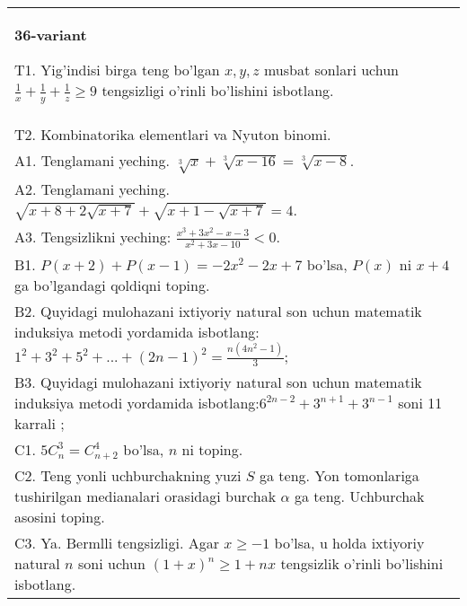 \documentclass{article}
\begin{document}
\begin{tabular}{m{17cm}}
\textbf{36-variant}
\newline

T1. Yig'indisi birga teng bo'lgan \(x,y,z\) musbat sonlari uchun \(\frac{1}{x} + \frac{1}{y} + \frac{1}{z} \geq 9\) tengsizligi o'rinli bo'lishini isbotlang. \\
T2. Kombinatorika elementlari va Nyuton binomi. \\
A1. Tenglamani yeching. \(\sqrt[3]{x} + \sqrt[3]{x - 16} = \sqrt[3]{x - 8}\). \\
A2. Tenglamani yeching. \(\sqrt{x + 8 + 2\sqrt{x + 7}} + \sqrt{x + 1 - \sqrt{x + 7}} = 4\). \\
A3. Tengsizlikni yeching: \(\frac{x^{3} + 3x^{2} - x - 3}{x^{2} + 3x - 10} < 0\). \\
B1. \(P(x + 2) + P(x - 1) = - 2x^{2} - 2x + 7\) bo'lsa, \(P(x)\) ni \(x + 4\) ga bo'lgandagi qoldiqni toping. \\
B2. Quyidagi mulohazani ixtiyoriy natural son uchun matematik induksiya metodi yordamida isbotlang: \(1^{2} + 3^{2} + 5^{2} + ... + (2n - 1)^{2} = \frac{n\left( 4n^{2} - 1 \right)}{3}\); \\
B3. Quyidagi mulohazani ixtiyoriy natural son uchun matematik induksiya metodi yordamida isbotlang:\(6^{2n - 2} + 3^{n + 1} + 3^{n - 1}\) soni 11 karrali ; \\
C1. \(5C_{n}^{3} = C_{n + 2}^{4}\) bo'lsa, \(n\) ni toping. \\
C2. Teng yonli uchburchakning yuzi \(S\) ga teng. Yon tomonlariga tushirilgan medianalari orasidagi burchak \(\alpha\) ga teng. Uchburchak asosini toping. \\
C3. Ya. Bermlli tengsizligi. Agar \(x \geq - 1\) bo'lsa, u holda ixtiyoriy natural \(n\) soni uchun \((1 + x)^{n} \geq 1 + nx\) tengsizlik o'rinli bo'lishini isbotlang. \\

\end{tabular}
\vspace{1cm}
\end{document}
